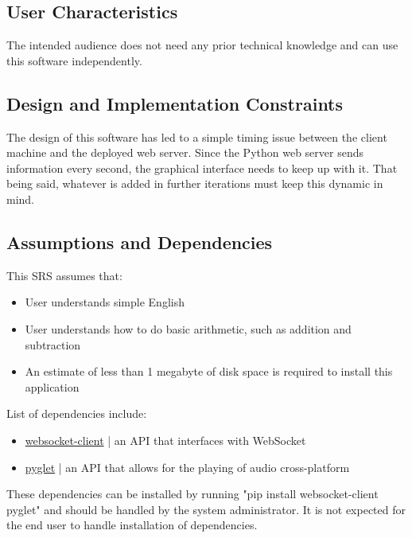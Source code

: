 \documentclass[12pt]{article}
\begin{document}
\subsection{User Characteristics}

The intended audience does not need any prior technical knowledge and can use this software independently.

\subsection{Design and Implementation Constraints}
The design of this software has led to a simple timing issue between the client machine and the deployed web server. 
Since the Python web server sends information every second, the graphical interface needs to keep up with it. 
That being said, whatever is added in further iterations must keep this dynamic in mind.

\subsection{Assumptions and Dependencies}

\begin{flushleft}

This SRS assumes that:

\begin{itemize}
\item User understands simple English
\item User understands how to do basic arithmetic, such as addition and subtraction
\item An estimate of less than 1 megabyte of disk space is required to install this application
\end{itemize}

List of dependencies include:

\begin{itemize}
\item \href{https://pypi.org/project/websocket_client/}{websocket-client} | an API that interfaces with WebSocket
\item \href{http://pyglet.org/}{pyglet} | an API that allows for the playing of audio cross-platform
\end{itemize}

These dependencies can be installed by running "pip install websocket-client pyglet" and should be handled by the system administrator.
It is not expected for the end user to handle installation of dependencies.

\end{flushleft}
\end{document}
